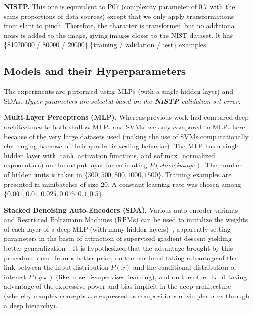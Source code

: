 \documentclass{article} %
\begin{document}
{\bf NISTP.} This one is equivalent to P07 (complexity parameter of $0.7$ with the same proportions of data sources)
  except that we only apply
  transformations from slant to pinch. Therefore, the character is
  transformed but no additional noise is added to the image, giving images
  closer to the NIST dataset. 
It has \{81920000 / 80000 / 20000\} \{training / validation / test\} examples.

\vspace*{-3mm}
\subsection{Models and their Hyperparameters}
\vspace*{-2mm}

The experiments are performed using MLPs (with a single
hidden layer) and SDAs.
\emph{Hyper-parameters are selected based on the {\bf NISTP} validation set error.}

{\bf Multi-Layer Perceptrons (MLP).}
Whereas previous work had compared deep architectures to both shallow MLPs and
SVMs, we only compared to MLPs here because of the very large datasets used
(making the use of SVMs computationally challenging because of their quadratic
scaling behavior).
The MLP has a single hidden layer with $\tanh$ activation functions, and softmax (normalized
exponentials) on the output layer for estimating $P(class | image)$.
The number of hidden units is taken in $\{300,500,800,1000,1500\}$. 
Training examples are presented in minibatches of size 20. A constant learning
rate was chosen among $\{0.001, 0.01, 0.025, 0.075, 0.1, 0.5\}$.
\vspace*{-1mm}


{\bf Stacked Denoising Auto-Encoders (SDA).}
Various auto-encoder variants and Restricted Boltzmann Machines (RBMs)
can be used to initialize the weights of each layer of a deep MLP (with many hidden 
layers)~\citep{Hinton06,ranzato-07-small,Bengio-nips-2006}, 
apparently setting parameters in the
basin of attraction of supervised gradient descent yielding better 
generalization~\citep{Erhan+al-2010}. It is hypothesized that the
advantage brought by this procedure stems from a better prior,
on the one hand taking advantage of the link between the input
distribution $P(x)$ and the conditional distribution of interest
$P(y|x)$ (like in semi-supervised learning), and on the other hand
taking advantage of the expressive power and bias implicit in the
deep architecture (whereby complex concepts are expressed as
compositions of simpler ones through a deep hierarchy).
\end{document}
